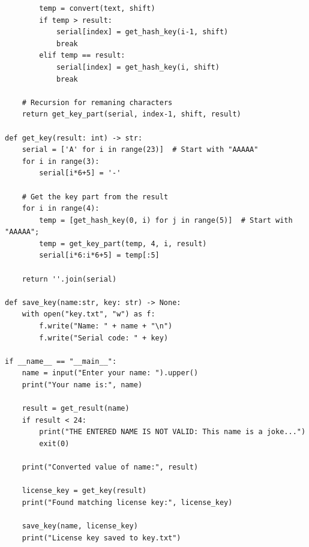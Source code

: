\begin{lstlisting}
        temp = convert(text, shift)
        if temp > result:
            serial[index] = get_hash_key(i-1, shift)
            break
        elif temp == result:
            serial[index] = get_hash_key(i, shift)
            break
        
    # Recursion for remaning characters
    return get_key_part(serial, index-1, shift, result)

def get_key(result: int) -> str:
    serial = ['A' for i in range(23)]  # Start with "AAAAA"
    for i in range(3):
        serial[i*6+5] = '-'
        
    # Get the key part from the result
    for i in range(4):
        temp = [get_hash_key(0, i) for j in range(5)]  # Start with "AAAAA";
        temp = get_key_part(temp, 4, i, result)
        serial[i*6:i*6+5] = temp[:5]
    
    return ''.join(serial)

def save_key(name:str, key: str) -> None:
    with open("key.txt", "w") as f:
        f.write("Name: " + name + "\n")
        f.write("Serial code: " + key)

if __name__ == "__main__":
    name = input("Enter your name: ").upper()
    print("Your name is:", name)

    result = get_result(name)
    if result < 24:
        print("THE ENTERED NAME IS NOT VALID: This name is a joke...")
        exit(0)

    print("Converted value of name:", result)
    
    license_key = get_key(result)
    print("Found matching license key:", license_key)
    
    save_key(name, license_key)
    print("License key saved to key.txt")

\end{lstlisting}